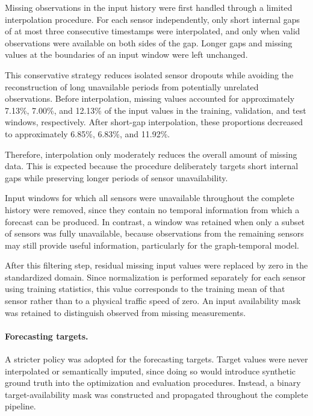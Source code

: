 Missing observations in the input history were first handled through a
limited interpolation procedure. For each sensor independently, only short
internal gaps of at most three consecutive timestamps were interpolated, and
only when valid observations were available on both sides of the gap. Longer
gaps and missing values at the boundaries of an input window were left
unchanged.

This conservative strategy reduces isolated sensor dropouts while avoiding
the reconstruction of long unavailable periods from potentially unrelated
observations. Before interpolation, missing values accounted for
approximately 7.13\%, 7.00\%, and 12.13\% of the input values in the
training, validation, and test windows, respectively. After short-gap
interpolation, these proportions decreased to approximately 6.85\%, 6.83\%,
and 11.92\%.

Therefore, interpolation only
moderately reduces the overall amount of missing data. This is expected
because the procedure deliberately targets short internal gaps while
preserving longer periods of sensor unavailability.

Input windows for which all sensors were unavailable throughout the complete
history were removed, since they contain no temporal information from which a
forecast can be produced. In contrast, a window was retained when only a
subset of sensors was fully unavailable, because observations from the
remaining sensors may still provide useful information, particularly for the
graph-temporal model.

After this filtering step, residual missing input values were replaced by
zero in the standardized domain. Since normalization is performed separately
for each sensor using training statistics, this value corresponds to the
training mean of that sensor rather than to a physical traffic speed of zero.
An input availability mask was retained to distinguish observed from missing
measurements.

\paragraph{Forecasting targets.}

A stricter policy was adopted for the forecasting targets. Target values were
never interpolated or semantically imputed, since doing so would introduce
synthetic ground truth into the optimization and evaluation procedures.
Instead, a binary target-availability mask was constructed and propagated
throughout the complete pipeline.

